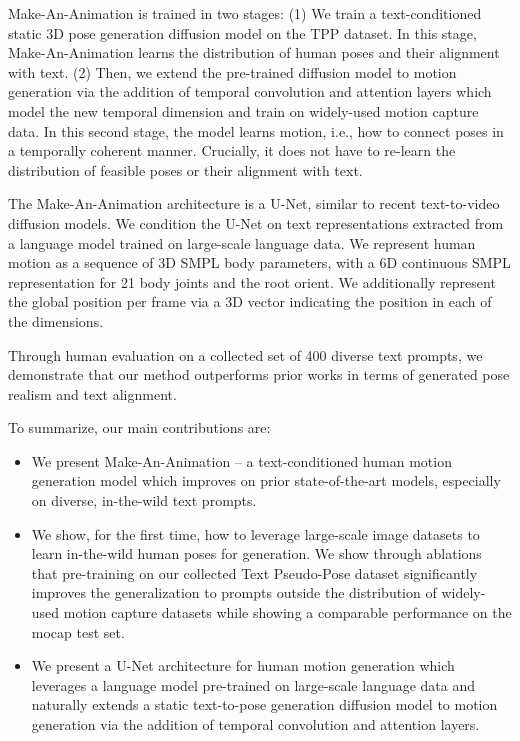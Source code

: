 \documentclass[10pt,twocolumn,letterpaper]{article}
\begin{document}
Make-An-Animation is trained in two stages: (1) We train a text-conditioned static 3D pose generation diffusion model on the TPP dataset. In this stage, Make-An-Animation learns the distribution of human poses and their alignment with text. (2) Then, we extend the pre-trained diffusion model to motion generation via the addition of temporal convolution and attention layers which model the new temporal dimension and train on widely-used motion capture data. In this second stage, the model learns motion, i.e., how to connect poses in a temporally coherent manner. Crucially, it does not have to re-learn the distribution of feasible poses or their alignment with text. 

The Make-An-Animation architecture is a U-Net, similar to recent text-to-video diffusion models. We condition the U-Net on text representations extracted from a language model trained on large-scale language data. We represent human motion as a sequence of 3D SMPL body parameters, with a 6D continuous SMPL representation for 21 body joints and the root orient. We additionally represent the global position per frame via a 3D vector indicating the position in each of the  dimensions.

Through human evaluation on a collected set of 400 diverse text prompts, we demonstrate that our method outperforms prior works in terms of generated pose realism and text alignment. 

To summarize, our main contributions are:
\begin{itemize}
    \item We present Make-An-Animation -- a text-conditioned human motion generation model which improves on prior state-of-the-art models, especially on diverse, in-the-wild text prompts.
    \item We show, for the first time, how to leverage large-scale image datasets to learn in-the-wild human poses for generation. We show through ablations that pre-training on our collected Text Pseudo-Pose dataset significantly improves the generalization to prompts outside the distribution of widely-used motion capture datasets while showing a comparable performance on the mocap test set.
    \item We present a U-Net architecture for human motion generation which leverages a language model pre-trained on large-scale language data and naturally extends a static text-to-pose generation diffusion model to motion generation via the addition of temporal convolution and attention layers. 
\end{itemize}
\end{document}
